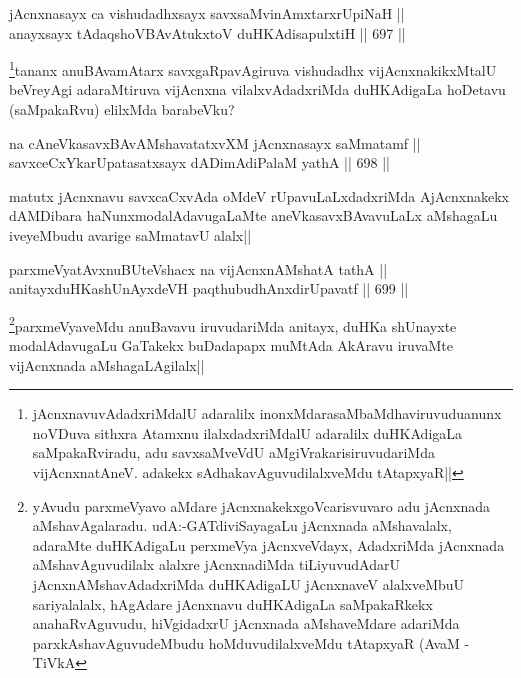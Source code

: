 
\begin{shl}
jAcnxnasayx ca vishudadhxsayx savxsaMvinAmxtarxrUpiNaH || \\
anayxsayx tAdaqshoV\s BAvAtukxtoV duHKAdisapulxtiH ||  697 ||  
\end{shl}

\begin{artha}
\footnote{jAcnxnavuvAdadxriMdalU adaralilx inonxMdarasaMbaMdhaviruvuduanunx noVDuva sithxra Atamxnu ilalxdadxriMdalU adaralilx duHKAdigaLa saMpakaRviradu, adu savxsaMveVdU aMgiVrakarisiruvudariMda vijAcnxnatAneV. adakekx sAdhakavAguvudilalxveMdu tAtapxyaR||}tananx anuBAvamAtarx savxgaRpavAgiruva vishudadhx vijAcnxnakikxMtalU beVreyAgi adaraMtiruva vijAcnxna vilalxvAdadxriMda duHKAdigaLa hoDetavu (saMpakaRvu) elilxMda barabeVku?
\end{artha}

\begin{shl}
na cAneVkasavxBAvAMshavatatxvXM jAcnxnasayx saMmatamf || \\
savxceCxYkarUpatasatxsayx dADimAdiPalaM yathA ||  698 ||  
\end{shl}

\begin{artha}
matutx jAcnxnavu savxcaCxvAda oMdeV rUpavuLaLxdadxriMda AjAcnxnakekx dAMDibara haNunxmodalAdavugaLaMte aneVkasavxBAvavuLaLx aMshagaLu iveyeMbudu avarige saMmatavU alalx||
\end{artha}

\begin{shl}
parxmeVyatAvxnuBUteVshacx na vijAcnxnAMshatA tathA || \\
anitayxduHKashUnAyxdeVH paqthubudhAnxdirUpavatf ||  699 ||  
\end{shl}

\begin{artha}
\footnote{yAvudu parxmeVyavo aMdare jAcnxnakekxgoVcarisvuvaro adu jAcnxnada aMshavAgalaradu. udA:-GATdiviSayagaLu jAcnxnada aMshavalalx, adaraMte duHKAdigaLu perxmeVya jAcnxveVdayx, AdadxriMda jAcnxnada aMshavAguvudilalx alalxre jAcnxnadiMda tiLiyuvudAdarU jAcnxnAMshavAdadxriMda duHKAdigaLU jAcnxnaveV alalxveMbuU sariyalalalx, hAgAdare jAcnxnavu duHKAdigaLa saMpakaRkekx anahaRvAguvudu, hiVgidadxrU jAcnxnada aMshaveMdare adariMda parxkAshavAguvudeMbudu hoMduvudilalxveMdu tAtapxyaR (AvaM -TiVkA}parxmeVyaveMdu anuBavavu iruvudariMda anitayx, duHKa shUnayxte modalAdavugaLu GaTakekx buDadapapx muMtAda AkAravu iruvaMte vijAcnxnada aMshagaLAgilalx||
\end{artha}

